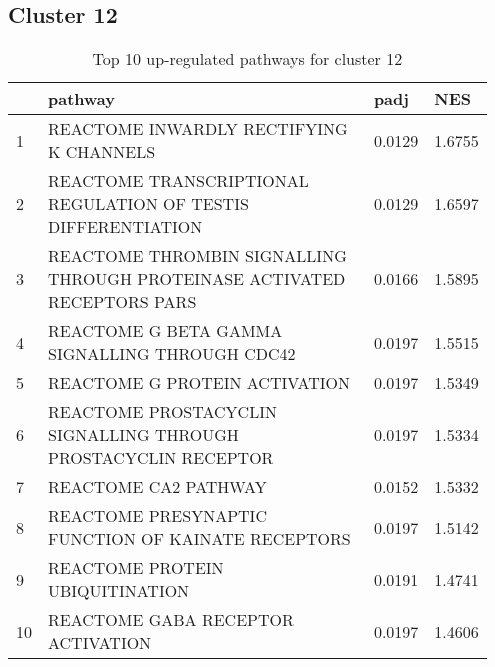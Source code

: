 \documentclass{article}
\begin{document}
\subsection{Cluster 12 }
\begin{table}[H]
\centering
\begin{tabular}{p{0.05\linewidth}p{0.7\linewidth}p{0.1\linewidth}p{0.1\linewidth}}
  \hline
 & pathway & padj & NES \\ 
  \hline
1 & REACTOME INWARDLY RECTIFYING K CHANNELS & 0.0129 & 1.6755 \\ 
  2 & REACTOME TRANSCRIPTIONAL REGULATION OF TESTIS DIFFERENTIATION & 0.0129 & 1.6597 \\ 
  3 & REACTOME THROMBIN SIGNALLING THROUGH PROTEINASE ACTIVATED RECEPTORS PARS & 0.0166 & 1.5895 \\ 
  4 & REACTOME G BETA GAMMA SIGNALLING THROUGH CDC42 & 0.0197 & 1.5515 \\ 
  5 & REACTOME G PROTEIN ACTIVATION & 0.0197 & 1.5349 \\ 
  6 & REACTOME PROSTACYCLIN SIGNALLING THROUGH PROSTACYCLIN RECEPTOR & 0.0197 & 1.5334 \\ 
  7 & REACTOME CA2 PATHWAY & 0.0152 & 1.5332 \\ 
  8 & REACTOME PRESYNAPTIC FUNCTION OF KAINATE RECEPTORS & 0.0197 & 1.5142 \\ 
  9 & REACTOME PROTEIN UBIQUITINATION & 0.0191 & 1.4741 \\ 
  10 & REACTOME GABA RECEPTOR ACTIVATION & 0.0197 & 1.4606 \\ 
   \hline
\end{tabular}
\caption{Top 10 up-regulated pathways for cluster 12} 
\label{tab:q3_2_12}
\end{table}
\end{document}
